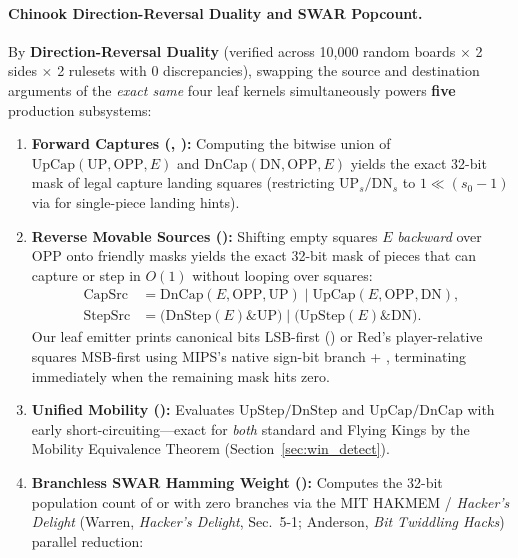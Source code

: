 \paragraph{Chinook Direction-Reversal Duality and SWAR Popcount.}
By \textbf{Direction-Reversal Duality} (verified across 10,000 random boards $\times$ 2 sides $\times$ 2 rulesets with 0 discrepancies), swapping the source and destination arguments of the \emph{exact same} four leaf kernels simultaneously powers \textbf{five} production subsystems:
\begin{enumerate}
    \item \textbf{Forward Captures (, ):} Computing the bitwise union of $\mathrm{UpCap}(\text{UP}, \text{OPP}, E)$ and $\mathrm{DnCap}(\text{DN}, \text{OPP}, E)$ yields the exact 32-bit mask of legal capture landing squares (restricting $\text{UP}_s/\text{DN}_s$ to $1 \ll (s_0 - 1)$ via  for single-piece landing hints).
    \item \textbf{Reverse Movable Sources ():} Shifting empty squares $E$ \emph{backward} over $\text{OPP}$ onto friendly masks yields the exact 32-bit mask of pieces that can capture or step in $O(1)$ without looping over squares:
    \begin{align}
        \text{CapSrc} &= \mathrm{DnCap}(E, \text{OPP}, \text{UP}) \mid \mathrm{UpCap}(E, \text{OPP}, \text{DN}), \label{eq:chinook_duality}\\
        \text{StepSrc} &= \big(\mathrm{DnStep}(E) \mathbin{\&} \text{UP}\big) \mid \big(\mathrm{UpStep}(E) \mathbin{\&} \text{DN}\big). \nonumber
    \end{align}
    Our leaf emitter  prints canonical bits LSB-first () or Red's player-relative squares MSB-first using MIPS's native sign-bit branch  + , terminating immediately when the remaining mask hits zero.
    \item \textbf{Unified Mobility ():} Evaluates $\mathrm{UpStep}/\mathrm{DnStep}$ and $\mathrm{UpCap}/\mathrm{DnCap}$ with early short-circuiting---exact for \emph{both} standard and Flying Kings by the Mobility Equivalence Theorem (Section~\ref{sec:win_detect}).
    \item \textbf{Branchless SWAR Hamming Weight ():} Computes the 32-bit population count of  or  with zero branches via the MIT HAKMEM / \emph{Hacker's Delight} (Warren, \emph{Hacker's Delight}, Sec.~5-1; Anderson, \emph{Bit Twiddling Hacks}) parallel reduction:

\end{enumerate}
